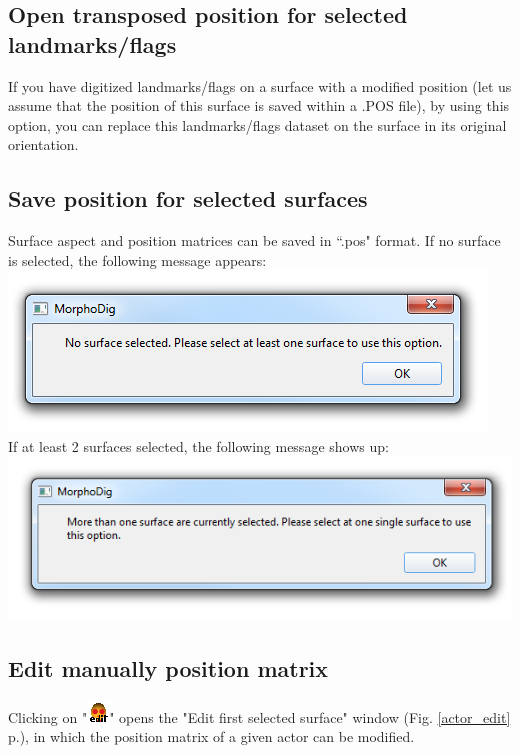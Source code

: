 \subsection{Open transposed position for selected landmarks/flags}
If you have digitized landmarks/flags on a surface with a modified position (let us assume that the position of this surface is saved within a .POS file), by using this option, you can replace this landmarks/flags dataset on the surface in its original orientation. 


\subsection{Save position for selected surfaces}
Surface aspect and position matrices can be saved in ``.pos" format. If no surface is selected, the
following message appears:\\
\includegraphics[scale=0.5]{images/07/position/no_surface_selected.png}
\\
If at least 2 surfaces selected, the following message shows up:\\
\includegraphics[scale=0.5]{images/07/position/at_least_2_surfaces_selected.png}

\subsection{Edit manually position matrix}
Clicking on "\includegraphics[scale=0.7]{images/06/objects/actor_edit.png}" opens the "Edit first selected surface" window (Fig. \ref{actor_edit} p.\pageref{actor_edit}), in which the position matrix of a given actor can be modified.




